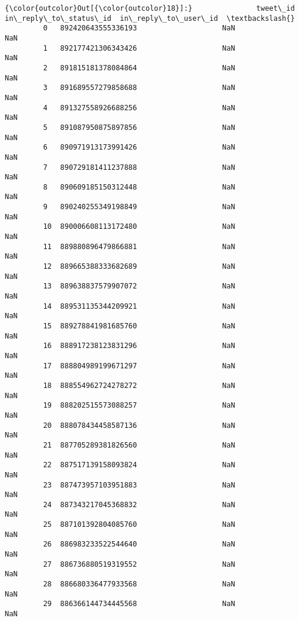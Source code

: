 \documentclass[11pt]{article}
\begin{document}
\begin{Verbatim}[commandchars=\\\{\}]
{\color{outcolor}Out[{\color{outcolor}18}]:}               tweet\_id  in\_reply\_to\_status\_id  in\_reply\_to\_user\_id  \textbackslash{}
         0   892420643555336193                    NaN                  NaN   
         1   892177421306343426                    NaN                  NaN   
         2   891815181378084864                    NaN                  NaN   
         3   891689557279858688                    NaN                  NaN   
         4   891327558926688256                    NaN                  NaN   
         5   891087950875897856                    NaN                  NaN   
         6   890971913173991426                    NaN                  NaN   
         7   890729181411237888                    NaN                  NaN   
         8   890609185150312448                    NaN                  NaN   
         9   890240255349198849                    NaN                  NaN   
         10  890006608113172480                    NaN                  NaN   
         11  889880896479866881                    NaN                  NaN   
         12  889665388333682689                    NaN                  NaN   
         13  889638837579907072                    NaN                  NaN   
         14  889531135344209921                    NaN                  NaN   
         15  889278841981685760                    NaN                  NaN   
         16  888917238123831296                    NaN                  NaN   
         17  888804989199671297                    NaN                  NaN   
         18  888554962724278272                    NaN                  NaN   
         19  888202515573088257                    NaN                  NaN   
         20  888078434458587136                    NaN                  NaN   
         21  887705289381826560                    NaN                  NaN   
         22  887517139158093824                    NaN                  NaN   
         23  887473957103951883                    NaN                  NaN   
         24  887343217045368832                    NaN                  NaN   
         25  887101392804085760                    NaN                  NaN   
         26  886983233522544640                    NaN                  NaN   
         27  886736880519319552                    NaN                  NaN   
         28  886680336477933568                    NaN                  NaN   
         29  886366144734445568                    NaN                  NaN   

\end{Verbatim}
\end{document}
